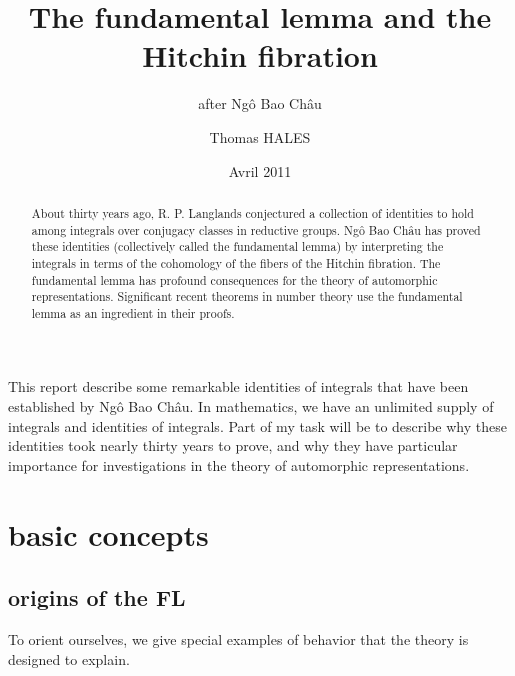 \documentclass[brochure,english,12pt]{bourbaki}
\date{Avril 2011}
\title{The fundamental lemma and the Hitchin fibration}
\subtitle{after Ng\^o Bao Ch\^au}
\author{Thomas HALES}
\newcommand{\NBC}{Ng\^o Bao Ch\^au}
\begin{document}
\maketitle



{


}

\bigskip



This report describe some remarkable identities of integrals that have
been established by \NBC.  In mathematics, we have an unlimited supply
of integrals and identities of integrals.  Part of my task 
will be to describe why these identities took nearly thirty years to
prove, and why they have particular importance for investigations in
the theory of automorphic representations.

\begin{abstract}
About thirty years ago, R. P. Langlands conjectured a collection of
identities to hold among integrals over conjugacy classes in
reductive groups.  Ng\^o Bao Ch\^au has proved these identities
(collectively called the fundamental lemma) by interpreting the
integrals in terms of the cohomology of the fibers of the Hitchin
fibration.  The fundamental lemma has profound consequences for the
theory of automorphic representations. Significant recent theorems in
number theory use the fundamental lemma as an ingredient in their
proofs.
\end{abstract}


\section{basic concepts}

\subsection{origins of the FL}


To orient ourselves, we give special examples of
behavior that the theory is designed to explain.
\end{document}
